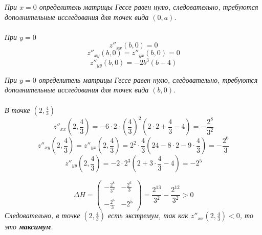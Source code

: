 \documentclass[a5paper, 10pt]{article}
\theoremstyle{definition}
\theoremstyle{plain}
\theoremstyle{remark}
\begin{document}
\textit{При $x = 0$ определитель матрицы Гессе равен нулю, следовательно, требуются дополнительные исследования для точек вида $ \left(0, a \right)$.}\\
\\

\textit{При $y = 0$}
\begin{equation}
z''_{xx} \left(b, 0 \right)  = 0
\end{equation}
\begin{equation}
z''_{xy} \left(b, 0 \right) = z''_{yx}\left(b, 0 \right)  = 0
\end{equation}
\begin{equation}
z''_{yy} \left(b, 0 \right)= -2b^3(b - 4)
\end{equation}

\textit{При $y = 0$ определитель матрицы Гессе равен нулю, следовательно, требуются дополнительные исследования для точек вида $ \left(b, 0 \right)$.}\\
\\

\textit{В точке $  \left(2, \frac{4}{3}\right)$}
\begin{equation}
z''_{xx}  \left(2, \frac{4}{3}\right) = -6\cdot 2\cdot  \left(\frac{4}{3} \right)^2(2\cdot 2+\frac{4}{3}-4)
= -\frac{2^8}{3^2}
\end{equation}
\begin{equation}
z''_{xy}  \left(2, \frac{4}{3}\right)= z''_{yx} \left(2, \frac{4}{3}\right)  = 2^2 \cdot \frac{4}{3}\left(24-8 \cdot 2-9 \cdot \frac{4}{3} \right)
= - \frac{2^6}{3}
\end{equation}
\begin{equation}
z''_{yy} \left(2, \frac{4}{3}\right)= -2 \cdot 2^3\left(2+3 \cdot \frac{4}{3}-4\right) = -2^5
\end{equation}


\begin{equation}
\Delta H = 
\begin{pmatrix}
-\frac{2^8}{3^2} &  - \frac{2^6}{3}\\
\\
 - \frac{2^6}{3} &  -2^5
\end{pmatrix}
=  \frac{2^{13}}{3^2} -  \frac{2^{12}}{3^2} > 0
\end{equation}
\textit{Следовательно, в точке $  \left(2, \frac{4}{3}\right)$ есть экстремум, так как $z''_{xx}  \left(2, \frac{4}{3}\right) < 0$, то это \textbf{максимум}.}\\
\\
\end{document}
